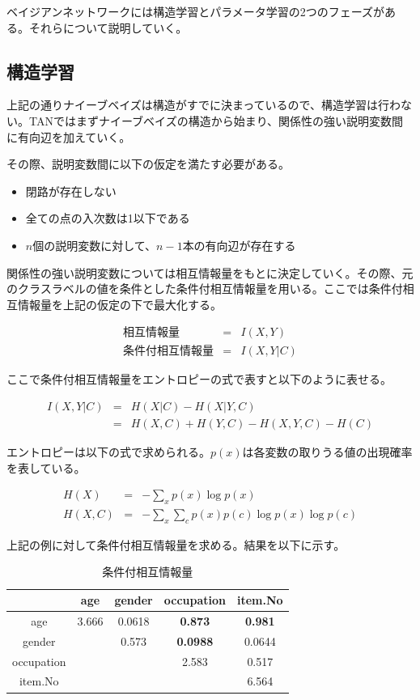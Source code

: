 \documentclass[a4paper,12pt]{jarticle}
\begin{document}
ベイジアンネットワークには構造学習とパラメータ学習の2つのフェーズがある。それらについて説明していく。

\subsection{構造学習}

上記の通りナイーブベイズは構造がすでに決まっているので、構造学習は行わない。TANではまずナイーブベイズの構造から始まり、関係性の強い説明変数間に有向辺を加えていく。

その際、説明変数間に以下の仮定を満たす必要がある。

\begin{itemize}
\item 閉路が存在しない

\item 全ての点の入次数は1以下である

\item $n$個の説明変数に対して、$n-1$本の有向辺が存在する
\end{itemize}

関係性の強い説明変数については相互情報量をもとに決定していく。その際、元のクラスラベルの値を条件とした条件付相互情報量を用いる。ここでは条件付相互情報量を上記の仮定の下で最大化する。

\begin{eqnarray*}
\mbox{相互情報量} &=& I(X, Y) \\
\mbox{条件付相互情報量} &=& I(X, Y | C)
\end{eqnarray*}

ここで条件付相互情報量をエントロピーの式で表すと以下のように表せる。

\begin{eqnarray*}
I(X, Y | C) &=& H(X|C) - H(X|Y, C) \\
               &=& H(X, C) + H(Y, C) - H(X, Y, C) - H(C)
\end{eqnarray*}

エントロピーは以下の式で求められる。$p(x)$は各変数の取りうる値の出現確率を表している。

\begin{eqnarray*}
H(X) &=& - \sum_x p(x) \log p(x) \\
H(X, C) &=& - \sum_x \sum_c p(x) p(c) \log p(x) \log p(c)
\end{eqnarray*}

上記の例に対して条件付相互情報量を求める。結果を以下に示す。

\begin{table}[H]
\begin{center}
\caption{条件付相互情報量}
\begin{tabular}{|c||c|c|c|c|} \hline  
& age & gender & occupation & item.No \\ \hline \hline
age & 3.666 & 0.0618 & \bf{0.873} & \bf{0.981} \\
gender &  & 0.573 & \bf{0.0988} & 0.0644 \\
occupation &  &  & 2.583 & 0.517 \\
item.No &  &  &  & 6.564 \\ \hline
\end{tabular}
\end{center}
\end{table}
\end{document}
